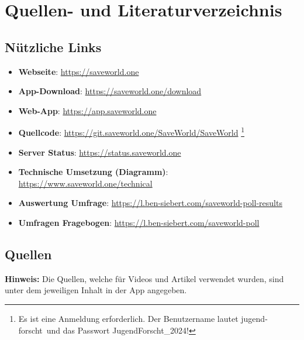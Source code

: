 \documentclass[../main.tex]{subfiles}
\begin{document}
    \chapter{Quellen- und Literaturverzeichnis}
    \thispagestyle{empty}


    \section{Nützliche Links}\label{sec:useful_links}
    \begin{itemize}
        \item \textbf{Webseite}: \url{https://saveworld.one}
        \item \textbf{App-Download}: \url{https://saveworld.one/download}
        \item \textbf{Web-App}: \url{https://app.saveworld.one}
        \item \textbf{Quellcode}: \url{https://git.saveworld.one/SaveWorld/SaveWorld} \footnote{Es ist eine Anmeldung erforderlich. Der Benutzername lautet \dq jugend-forscht\dq\ und das Passwort \dq JugendForscht\_2024!\dq}
        \item \textbf{Server Status}: \url{https://status.saveworld.one}
        \item \textbf{Technische Umsetzung (Diagramm)}: \url{https://www.saveworld.one/technical}
        \item \textbf{Auswertung Umfrage}: \url{https://l.ben-siebert.com/saveworld-poll-results}
        \item \textbf{Umfragen Fragebogen}: \url{https://l.ben-siebert.com/saveworld-poll}
    \end{itemize}

    \section{Quellen}
    \printbibliography[heading=none]
    \textbf{Hinweis:} Die Quellen, welche für Videos und Artikel verwendet wurden, sind unter dem jeweiligen Inhalt in der App angegeben.
\end{document}
